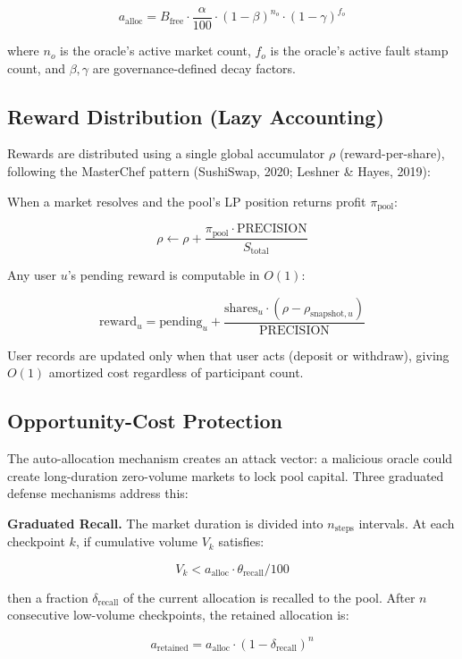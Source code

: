 \documentclass{ledger}
\theoremstyle{plain}
\theoremstyle{remark}
\begin{document}
\[
a_{\text{alloc}} = B_{\text{free}} \cdot \frac{\alpha}{100} \cdot
(1 - \beta)^{n_o} \cdot (1 - \gamma)^{f_o}
\]

where $n_o$ is the oracle's active market count, $f_o$ is the oracle's active
fault stamp count, and $\beta, \gamma$ are governance-defined decay factors.

\subsection{Reward Distribution (Lazy Accounting)}\label{sec:lazyacct}

Rewards are distributed using a single global accumulator $\rho$
(reward-per-share), following the MasterChef pattern (SushiSwap, 2020; Leshner \&
Hayes, 2019):

When a market resolves and the pool's LP position returns profit
$\pi_{\text{pool}}$:

\[
\rho \leftarrow \rho + \frac{\pi_{\text{pool}} \cdot \text{PRECISION}}{S_{\text{total}}}
\]

Any user $u$'s pending reward is computable in $O(1)$:

\[
\text{reward}_u = \text{pending}_u + \frac{\text{shares}_u \cdot (\rho -
\rho_{\text{snapshot},u})}{\text{PRECISION}}
\]

User records are updated only when that user acts (deposit or withdraw), giving
$O(1)$ amortized cost regardless of participant count.

\subsection{Opportunity-Cost Protection}\label{sec:oppcost}

The auto-allocation mechanism creates an attack vector: a malicious oracle could
create long-duration zero-volume markets to lock pool capital. Three graduated
defense mechanisms address this:

\textbf{Graduated Recall.} The market duration is divided into $n_{\text{steps}}$
intervals. At each checkpoint $k$, if cumulative volume $V_k$ satisfies:

\[
V_k < a_{\text{alloc}} \cdot \theta_{\text{recall}} / 100
\]

then a fraction $\delta_{\text{recall}}$ of the current allocation is recalled to
the pool. After $n$ consecutive low-volume checkpoints, the retained allocation
is:

\[
a_{\text{retained}} = a_{\text{alloc}} \cdot (1 - \delta_{\text{recall}})^n
\]
\end{document}
